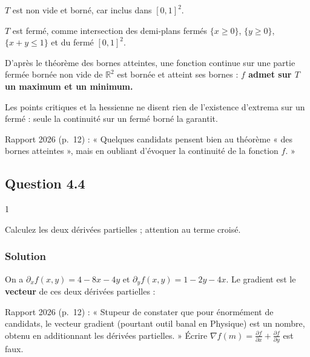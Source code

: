 \documentclass[11pt,a4paper]{article}
\newcommand{\equationajustee}[1]{%
  \sbox{\boiteequation}{$\displaystyle #1$}%
  \ifdim\wd\boiteequation>\linewidth
    \[\resizebox{\linewidth}{!}{\usebox{\boiteequation}}\]%
  \else
    \[#1\]%
  \fi}
\begin{document}
\(T\) est non vide et borné, car inclus dans \([0,1]^2\).

\(T\) est fermé, comme intersection des demi-plans fermés \(\{x\ge0\}\), \(\{y\ge0\}\), \(\{x+y\le1\}\) et du fermé \([0,1]^2\).

D'après le théorème des bornes atteintes, une fonction continue sur une partie fermée bornée non vide de \(\mathbb R^2\) est bornée et atteint ses bornes : \textbf{\(f\) admet sur \(T\) un maximum et un minimum.}

\begin{piege}

Les points critiques et la hessienne ne disent rien de l'existence d'extrema sur un fermé : seule la continuité sur un fermé borné la garantit.

\end{piege}

\begin{jury}

Rapport 2026 (p.~12) : « Quelques candidats pensent bien au théorème « des bornes atteintes », mais en oubliant d'évoquer la continuité de la fonction \(f\). »

\end{jury}

\hypertarget{question-4.4}{%
\subsection{Question 4.4}\label{question-4.4}}

\begin{indication}{1}

Calculez les deux dérivées partielles ; attention au terme croisé.

\end{indication}

\hypertarget{solution-36}{%
\subsubsection{Solution}\label{solution-36}}

On a \(\partial_xf(x,y)=4-8x-4y\) et \(\partial_yf(x,y)=1-2y-4x\). Le gradient est le \textbf{vecteur} de ces deux dérivées partielles :

\equationajustee{\boxed{\nabla f(m)=\begin{pmatrix}4-8x-4y\\1-4x-2y\end{pmatrix}}}

\begin{jury}

Rapport 2026 (p.~12) : « Stupeur de constater que pour énormément de candidats, le vecteur gradient (pourtant outil banal en Physique) est un nombre, obtenu en additionnant les dérivées partielles. » Écrire \(\nabla f(m)=\frac{\partial f}{\partial x}+\frac{\partial f}{\partial y}\) est faux.

\end{jury}
\end{document}
